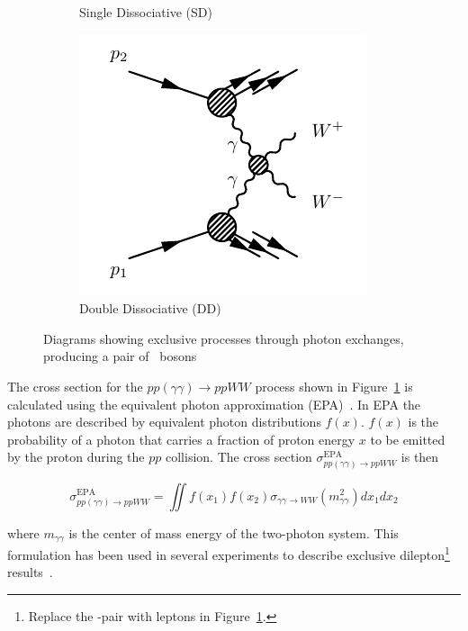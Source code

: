 \begin{figure}[!h]
\begin{subfigure}{0.33\textwidth}
\caption{Single Dissociative (SD)}
\end{subfigure}%
\begin{subfigure}{0.33\textwidth}
   \includegraphics[width=\textwidth]{figures/exclWWdd.pdf}
\caption{Double Dissociative (DD)}
\end{subfigure} %
\caption{Diagrams showing exclusive processes through photon exchanges, producing a pair of \Wpm\ bosons}
\label{fig:exclWW}
\end{figure}

\par The cross section for the $pp(\gamma\gamma)\to ppWW$ process shown in Figure~\ref{fig:exclWW} is calculated using the 
equivalent photon approximation (EPA)~\cite{EPA0,EPA}. In EPA the photons are described by equivalent photon 
distributions $f(x)$. $f(x)$ is the probability of a photon that carries a fraction of proton energy $x$ to 
be emitted by the proton during the $pp$ collision. The cross section $\sigma_{pp(\gamma\gamma)\to ppWW}^{\text{EPA}}$ is 
then 

\begin{equation}
\sigma_{pp(\gamma\gamma)\to ppWW}^{\text{EPA}} = \iint f(x_1) f(x_2) \sigma_{\gamma\gamma\to WW} (m_{\gamma\gamma}^2) dx_1 dx_2 
\end{equation} 

where $m_{\gamma\gamma}$ is the center of mass energy of the two-photon system. This formulation has been used in several 
experiments to describe exclusive dilepton\footnote{Replace the \Wpm-pair with leptons in Figure~\ref{fig:exclWW}.} 
results~\cite{CDFgg,STARgg,CMSmumu,CMSee}.    
